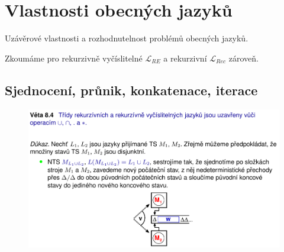 
\section{Vlastnosti obecných jazyků}

Uzávěrové vlastnosti a rozhodnutelnost problémů obecných jazyků.

\begin{compactitem}
    \item Zkoumáme pro rekurzivně vyčíslitelné $\mathcal{L}_{RE}$ a rekurzivní $\mathcal{L}_{Rec}$ zároveň.
\end{compactitem}



\subsection{Sjednocení, průnik, konkatenace, iterace}

\begin{figure}[H]
    \centering
    \includegraphics[width=1\linewidth]{uzaverove_vlasnosti_L0_01.pdf}
\end{figure}

